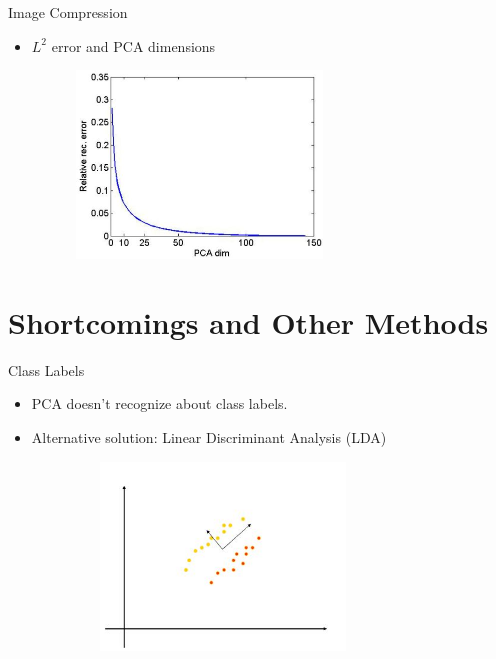 \documentclass[serif, aspectratio=169]{beamer}
\begin{document}
\begin{frame}{Image Compression}
      \begin{itemize}
          \item $L^2$ error and PCA dimensions
      \end{itemize}
        \begin{figure}[htpb]
            \begin{center}
                \includegraphics[width=8cm, height=5cm]{pic/error.JPG}
            \end{center}
        \end{figure}
\end{frame}

\section{Shortcomings and Other Methods}

\begin{frame}{Class Labels}
    \begin{itemize}
        \item PCA doesn’t recognize about class labels.
        \item Alternative solution: Linear Discriminant Analysis (LDA)
        \begin{figure}[htpb]
            \begin{center}
                \includegraphics[width=8cm, height=5cm]{pic/labels.JPG}
            \end{center}
        \end{figure}
    \end{itemize}
\end{frame}
\end{document}
